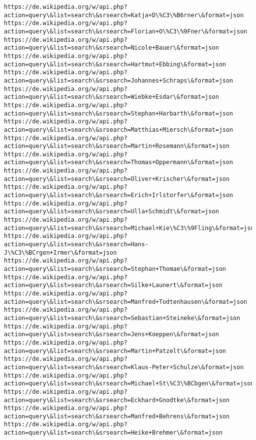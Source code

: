 \documentclass[11pt]{article}
\begin{document}
\begin{Verbatim}[commandchars=\\\{\}]
https://de.wikipedia.org/w/api.php?action=query\&list=search\&srsearch=Katja+D\%C3\%B6rner\&format=json
https://de.wikipedia.org/w/api.php?action=query\&list=search\&srsearch=Florian+O\%C3\%9Fner\&format=json
https://de.wikipedia.org/w/api.php?action=query\&list=search\&srsearch=Nicole+Bauer\&format=json
https://de.wikipedia.org/w/api.php?action=query\&list=search\&srsearch=Hartmut+Ebbing\&format=json
https://de.wikipedia.org/w/api.php?action=query\&list=search\&srsearch=Johannes+Schraps\&format=json
https://de.wikipedia.org/w/api.php?action=query\&list=search\&srsearch=Wiebke+Esdar\&format=json
https://de.wikipedia.org/w/api.php?action=query\&list=search\&srsearch=Stephan+Harbarth\&format=json
https://de.wikipedia.org/w/api.php?action=query\&list=search\&srsearch=Matthias+Miersch\&format=json
https://de.wikipedia.org/w/api.php?action=query\&list=search\&srsearch=Martin+Rosemann\&format=json
https://de.wikipedia.org/w/api.php?action=query\&list=search\&srsearch=Thomas+Oppermann\&format=json
https://de.wikipedia.org/w/api.php?action=query\&list=search\&srsearch=Oliver+Krischer\&format=json
https://de.wikipedia.org/w/api.php?action=query\&list=search\&srsearch=Erich+Irlstorfer\&format=json
https://de.wikipedia.org/w/api.php?action=query\&list=search\&srsearch=Ulla+Schmidt\&format=json
https://de.wikipedia.org/w/api.php?action=query\&list=search\&srsearch=Michael+Kie\%C3\%9Fling\&format=json
https://de.wikipedia.org/w/api.php?action=query\&list=search\&srsearch=Hans-J\%C3\%BCrgen+Irmer\&format=json
https://de.wikipedia.org/w/api.php?action=query\&list=search\&srsearch=Stephan+Thomae\&format=json
https://de.wikipedia.org/w/api.php?action=query\&list=search\&srsearch=Silke+Launert\&format=json
https://de.wikipedia.org/w/api.php?action=query\&list=search\&srsearch=Manfred+Todtenhausen\&format=json
https://de.wikipedia.org/w/api.php?action=query\&list=search\&srsearch=Sebastian+Steineke\&format=json
https://de.wikipedia.org/w/api.php?action=query\&list=search\&srsearch=Jens+Koeppen\&format=json
https://de.wikipedia.org/w/api.php?action=query\&list=search\&srsearch=Martin+Patzelt\&format=json
https://de.wikipedia.org/w/api.php?action=query\&list=search\&srsearch=Klaus-Peter+Schulze\&format=json
https://de.wikipedia.org/w/api.php?action=query\&list=search\&srsearch=Michael+St\%C3\%BCbgen\&format=json
https://de.wikipedia.org/w/api.php?action=query\&list=search\&srsearch=Eckhard+Gnodtke\&format=json
https://de.wikipedia.org/w/api.php?action=query\&list=search\&srsearch=Manfred+Behrens\&format=json
https://de.wikipedia.org/w/api.php?action=query\&list=search\&srsearch=Heike+Brehmer\&format=json

\end{Verbatim}
\end{document}

